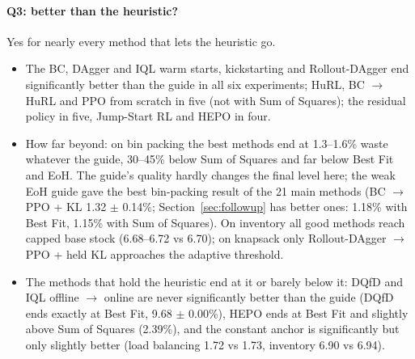 \documentclass[11pt,a4paper]{article}
\begin{document}
\paragraph{Q3: better than the heuristic?} Yes for nearly every method that lets the heuristic go.
\begin{itemize}[leftmargin=*]
\item The BC, DAgger and IQL warm starts, kickstarting and Rollout-DAgger end significantly better than the guide in
  all six experiments; HuRL, BC $\to$ HuRL and PPO from scratch in five (not with Sum of Squares); the residual
  policy in five, Jump-Start RL and HEPO in four.
\item How far beyond: on bin packing the best methods end at 1.3--1.6\% waste whatever the guide, 30--45\% below Sum
  of Squares and far below Best Fit and EoH. The guide's quality hardly changes the final level here; the weak EoH
  guide gave the best bin-packing result of the 21 main methods (BC $\to$ PPO + KL 1.32 $\pm$ 0.14\%;
  Section~\ref{sec:followup} has better ones: 1.18\% with Best Fit, 1.15\% with Sum of Squares). On inventory all good methods
  reach capped base stock (6.68--6.72 vs 6.70); on knapsack only Rollout-DAgger $\to$ PPO + held KL approaches the
  adaptive threshold.
\item The methods that hold the heuristic end at it or barely below it: DQfD and IQL offline $\to$ online are
  never significantly better than the guide (DQfD ends exactly at Best Fit, 9.68 $\pm$ 0.00\%), HEPO ends at
  Best Fit and slightly above Sum of Squares (2.39\%), and the constant anchor is significantly but only slightly better (load balancing
  1.72 vs 1.73, inventory 6.90 vs 6.94).
\end{itemize}
\end{document}
